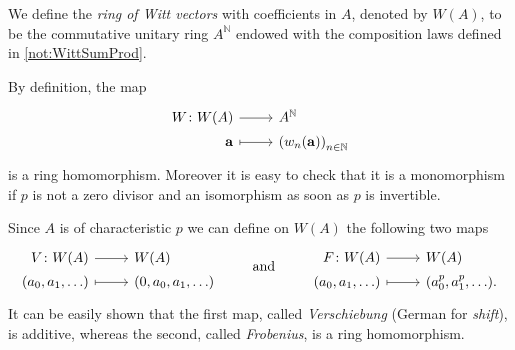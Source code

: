 \begin{defn}
	We define the {\em ring of Witt vectors} with coefficients in $A$,
	denoted by $W(A)$, to be the commutative unitary ring $A^{\mathbb{N}}$
	endowed with the composition laws defined in \cref{not:WittSumProd}.
\end{defn}


\begin{rem}[]
	By definition, the map
	\begin{equation*}
	\begin{tikzcd}[row sep = 0ex
		,/tikz/column 1/.append style={anchor=base east}
		,/tikz/column 2/.append style={anchor=base west}]
		W\colon W(A) \arrow[r, "", rightarrow] &
		A^{\mathbb{N}} \\
		\mathbf{a} \arrow[r, "", mapsto] & 
		\left( w_n(\mathbf{a}) \right)_{n \in \mathbb{N}}
	\end{tikzcd}
	\end{equation*} 
	is a ring homomorphism.
	Moreover it is easy to check that it is 
	a monomorphism if $p$ is not a zero divisor and
	an isomorphism as soon as $p$ is invertible. 
\end{rem}


\begin{defn}
	Since $A$ is of characteristic $p$ we can define on $W(A)$ the following two
	maps
	\begin{equation*}
	\begin{tikzcd}[row sep = 0ex
		,/tikz/column 1/.append style={anchor=base east}
		,/tikz/column 2/.append style={anchor=base west}]
		V\colon W(A) \arrow[r, "", rightarrow] &
		W(A) \\
		(a_0, a_1, \ldots) \arrow[r, "", mapsto] & 
		(0, a_0, a_1, \ldots)
	\end{tikzcd}
	\qquad \text{ and } \qquad
	\begin{tikzcd}[row sep = 0ex
		,/tikz/column 1/.append style={anchor=base east}
		,/tikz/column 2/.append style={anchor=base west}]
		F\colon W(A) \arrow[r, "", rightarrow] &
		W(A) \\
		(a_0, a_1, \ldots) \arrow[r, "", mapsto] & 
		(a_0^p, a_1^p, \ldots)
	.\end{tikzcd}
	\end{equation*} 
	It can be easily shown that the first map, called {\em Verschiebung}
	(German for {\em shift}), is additive, whereas the second, called {\em Frobenius},
	is a ring homomorphism.
\end{defn}


